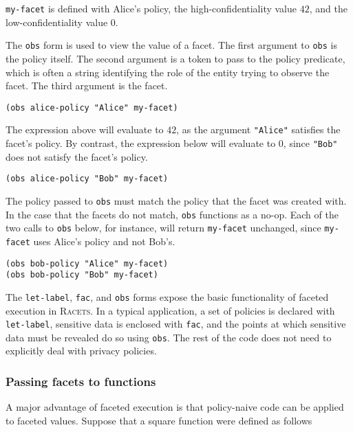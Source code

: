 \documentclass{article}
\begin{document}
\texttt{my-facet} is defined with Alice's policy, the high-confidentiality value $42$, and the low-confidentiality value $0$.

The \texttt{obs} form is used to view the value of a facet. The first argument to \texttt{obs} is the policy itself. The second argument is a token to pass to the policy predicate, which is often a string identifying the role of the entity trying to observe the facet. The third argument is the facet.

\begin{lstlisting}
(obs alice-policy "Alice" my-facet)
\end{lstlisting}

The expression above will evaluate to $42$, as the argument \texttt{"Alice"} satisfies the facet's policy. By contrast, the expression below will evaluate to $0$, since \texttt{"Bob"} does not satisfy the facet's policy.

\begin{lstlisting}
(obs alice-policy "Bob" my-facet)
\end{lstlisting}

The policy passed to \texttt{obs} must match the policy that the facet was created with. In the case that the facets do not match, \texttt{obs} functions as a no-op. Each of the two calls to \texttt{obs} below, for instance, will return \texttt{my-facet} unchanged, since \texttt{my-facet} uses Alice's policy and not Bob's.

\begin{lstlisting}
(obs bob-policy "Alice" my-facet)
(obs bob-policy "Bob" my-facet)
\end{lstlisting}

The \texttt{let-label}, \texttt{fac}, and \texttt{obs} forms expose the basic functionality of faceted execution in \textsc{Racets}. In a typical application, a set of policies is declared with \texttt{let-label}, sensitive data is enclosed with \texttt{fac}, and the points at which sensitive data must be revealed do so using \texttt{obs}. The rest of the code does not need to explicitly deal with privacy policies.


\subsubsection{Passing facets to functions}
A major advantage of faceted execution is that policy-naive code can be applied to faceted values. Suppose that a square function were defined as follows
\end{document}
